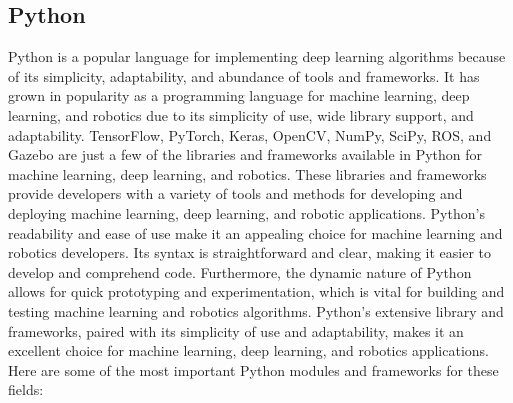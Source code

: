 \documentclass[12pt,oneside]{article}
\begin{document}
\subsection{Python}
Python is a popular language for implementing deep learning algorithms because of its simplicity, adaptability, and abundance of tools and frameworks. It has grown in popularity as a programming language for machine learning, deep learning, and robotics due to its simplicity of use, wide library support, and adaptability. TensorFlow, PyTorch, Keras, OpenCV, NumPy, SciPy, ROS, and Gazebo are just a few of the libraries and frameworks available in Python for machine learning, deep learning, and robotics. These libraries and frameworks provide developers with a variety of tools and methods for developing and deploying machine learning, deep learning, and robotic applications. Python's readability and ease of use make it an appealing choice for machine learning and robotics developers. Its syntax is straightforward and clear, making it easier to develop and comprehend code. Furthermore, the dynamic nature of Python allows for quick prototyping and experimentation, which is vital for building and testing machine learning and robotics algorithms. Python's extensive library and frameworks, paired with its simplicity of use and adaptability, makes it an excellent choice for machine learning, deep learning, and robotics applications. Here are some of the most important Python modules and frameworks for these fields:
\end{document}
